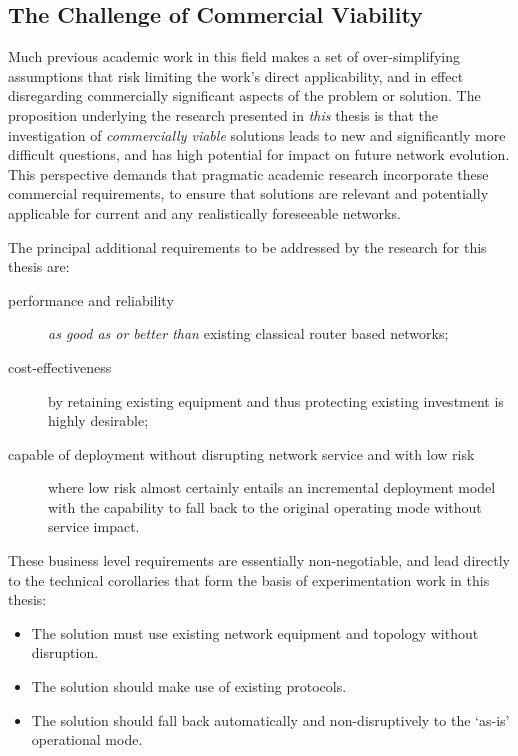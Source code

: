 \subsection{The Challenge of Commercial Viability}

Much previous academic work in this field makes a set of over-simplifying assumptions that risk limiting the work's direct applicability, and in effect disregarding commercially significant aspects of the problem or solution.
The proposition underlying the research presented in \textit{this} thesis is that the investigation of \textit{commercially viable} solutions leads to new and significantly more difficult questions, and has high potential for impact on future network evolution.
This perspective demands that pragmatic academic research incorporate these commercial requirements, to ensure that solutions are relevant and potentially applicable for current and any realistically foreseeable networks.

\medskip

The principal additional requirements to be addressed by the research for this thesis are:

\begin{description}
	\item [performance and reliability] \textit{as good as or better than} existing classical router based networks;
	\item[cost-effectiveness] by retaining existing equipment and thus protecting existing investment is highly desirable;
	\item[capable of deployment without disrupting network service and with low risk] where low risk almost certainly entails an incremental deployment model with the capability to fall back to the original operating mode without service impact.
\end{description}

These business level requirements are essentially non-negotiable, and lead directly to the technical corollaries that form the basis of  experimentation work in  this thesis:
\begin{itemize}
	\item The solution must use existing network equipment and topology without disruption.
	\item The solution should make use of existing protocols.
	\item The solution should fall back automatically and non-disruptively to the ‘as-is’ operational mode.
\end{itemize}

